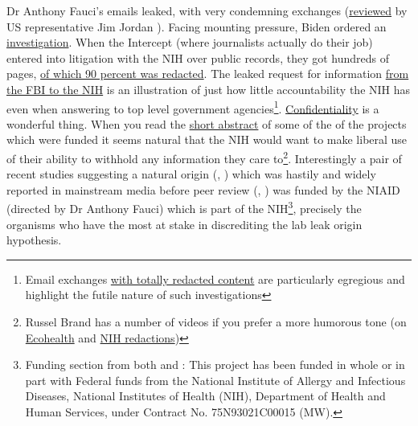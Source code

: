 \documentclass[11pt,a4paper,notitlepage]{report}
\begin{document}
Dr Anthony Fauci's emails leaked, with very condemning exchanges (\href{https://www.youtube.com/watch?v=q3F2ZJGipiE}{reviewed} by US representative Jim Jordan \cite{jimjordan29062021}). Facing mounting pressure, Biden ordered an \href{https://www.bbc.com/news/world-us-canada-57260009}{investigation}. When the Intercept (where journalists actually do their job) entered into litigation with the NIH over public records, they got hundreds of pages, \href{https://theintercept.com/2022/02/20/nih-coronavirus-research-wuhan-redacted/}{of which 90 percent was redacted}. The leaked request for information \href{https://theintercept.com/2022/01/20/coronavirus-research-china-ecohealth-fbi/}{from the FBI to the NIH} is an illustration of just how little accountability the NIH has even when answering to top level government agencies\footnote{Email exchanges \href{https://www.documentcloud.org/documents/21182424-pages-from-nih_foia_274}{with totally redacted content} are particularly egregious and highlight the futile nature of such investigations}. \href{https://grants.nih.gov/grants/policy/nihgps/html5/section_2/2.3.11_availability_and_confidentiality_of_information.htm}{Confidentiality} is a wonderful thing. When you read the \href{https://reporter.nih.gov/search/-bvPCvB7zkyvb1AjAgW5Yg/project-details/8674931}{short abstract} of some of the of the projects which were funded it seems natural that the NIH would want to make liberal use of their ability to withhold any information they care to\footnote{Russel Brand has a number of videos if you prefer a more humorous tone (on \href{https://www.youtube.com/watch?v=yTbzyirwnoQ}{Ecohealth} and \href{https://www.youtube.com/watch?v=ZNKG8d0ujwo}{NIH redactions})}. Interestingly a pair of recent studies suggesting a natural origin (\cite{pekar_jonathan_e_2022_6332858}, \cite{michael_worobey_2022_6299116}) which was hastily and widely reported in mainstream media before peer review (\cite{guardian26022022}, \cite{newyorktimes27012022}) was funded by the NIAID (directed by Dr Anthony Fauci) which is part of the NIH\footnote{Funding section from both \citet{pekar_jonathan_e_2022_6332858} and \citet{michael_worobey_2022_6299116} : This project has been funded in whole or in part with Federal funds from the National Institute of Allergy and Infectious Diseases, National Institutes of Health (NIH), Department of Health and Human Services, under Contract No. 75N93021C00015 (MW).}, precisely the organisms who have the most at stake in discrediting the lab leak origin hypothesis. 

\end{document}
